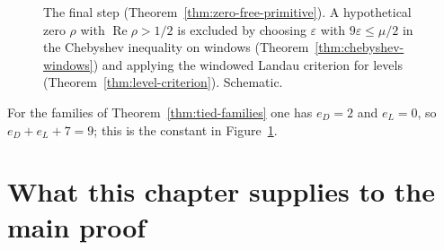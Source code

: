 \documentclass[11pt]{amsbook}
\theoremstyle{plain}
\theoremstyle{definition}
\theoremstyle{remark}
\numberwithin{equation}{section}
\numberwithin{figure}{chapter}
\numberwithin{table}{chapter}
\newcommand{\eps}{\varepsilon}
\begin{document}
\begin{figure}[htbp]
\centering

\caption{The final step (Theorem~\ref{thm:zero-free-primitive}). A
hypothetical zero $\rho$ with $\operatorname{Re}\rho>1/2$ is excluded
by choosing $\eps$ with $9\eps\le\mu/2$ in the Chebyshev inequality on
windows (Theorem~\ref{thm:chebyshev-windows}) and applying the
windowed Landau criterion for levels
(Theorem~\ref{thm:level-criterion}). Schematic.}
\label{fig:eps}
\end{figure}

\noindent For the families of Theorem~\ref{thm:tied-families} one has
$e_D=2$ and $e_L=0$, so $e_D+e_L+7=9$; this is the constant in
Figure~\ref{fig:eps}.
\begin{figure}[tbp]
\centering

\end{figure}

\section{What this chapter supplies to the main proof}
\label{sec:families-to-assembly}
\end{document}
